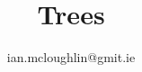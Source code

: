 \documentclass[dvipsnames,hidelinks,t]{beamer}
\begin{document}
    \title{Trees}
    \subtitle{}
    \author{ian.mcloughlin@gmit.ie}
    \date{}
  
    \begin{frame}
      \titlepage
    \end{frame}
  
     
  
\end{document}
